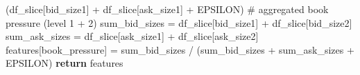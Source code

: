 \documentclass[
  letterpaper,
  DIV=11,
  numbers=noendperiod]{scrartcl}
\newenvironment{Shaded}{\begin{snugshade}}{\end{snugshade}}
\newcommand{\CommentTok}[1]{\textcolor[rgb]{0.37,0.37,0.37}{#1}}
\newcommand{\ControlFlowTok}[1]{\textcolor[rgb]{0.00,0.23,0.31}{\textbf{#1}}}
\newcommand{\NormalTok}[1]{\textcolor[rgb]{0.00,0.23,0.31}{#1}}
\newcommand{\OperatorTok}[1]{\textcolor[rgb]{0.37,0.37,0.37}{#1}}
\newcommand{\StringTok}[1]{\textcolor[rgb]{0.13,0.47,0.30}{#1}}
\begin{document}
\begin{Shaded}
\begin{Highlighting}[]
\NormalTok{                                  (df\_slice[}\StringTok{\textquotesingle{}bid\_size1\textquotesingle{}}\NormalTok{] }\OperatorTok{+}\NormalTok{ df\_slice[}\StringTok{\textquotesingle{}ask\_size1\textquotesingle{}}\NormalTok{] }\OperatorTok{+}\NormalTok{ EPSILON)}
    \CommentTok{\# aggregated book pressure (level 1 + 2)}
\NormalTok{    sum\_bid\_sizes }\OperatorTok{=}\NormalTok{ df\_slice[}\StringTok{\textquotesingle{}bid\_size1\textquotesingle{}}\NormalTok{] }\OperatorTok{+}\NormalTok{ df\_slice[}\StringTok{\textquotesingle{}bid\_size2\textquotesingle{}}\NormalTok{]}
\NormalTok{    sum\_ask\_sizes }\OperatorTok{=}\NormalTok{ df\_slice[}\StringTok{\textquotesingle{}ask\_size1\textquotesingle{}}\NormalTok{] }\OperatorTok{+}\NormalTok{ df\_slice[}\StringTok{\textquotesingle{}ask\_size2\textquotesingle{}}\NormalTok{]}
\NormalTok{    features[}\StringTok{\textquotesingle{}book\_pressure\textquotesingle{}}\NormalTok{] }\OperatorTok{=}\NormalTok{ sum\_bid\_sizes }\OperatorTok{/}\NormalTok{ (sum\_bid\_sizes }\OperatorTok{+}\NormalTok{ sum\_ask\_sizes }\OperatorTok{+}\NormalTok{ EPSILON)}
    \ControlFlowTok{return}\NormalTok{ features}
\end{Highlighting}
\end{Shaded}
\end{document}
